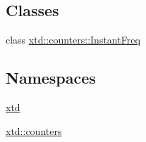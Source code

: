 \subsection*{Classes}
\begin{DoxyCompactItemize}
\item 
class \hyperlink{classxtd_1_1counters_1_1InstantFreq}{xtd\-::counters\-::\-Instant\-Freq}
\end{DoxyCompactItemize}
\subsection*{Namespaces}
\begin{DoxyCompactItemize}
\item 
\hyperlink{namespacextd}{xtd}
\item 
\hyperlink{namespacextd_1_1counters}{xtd\-::counters}
\end{DoxyCompactItemize}
